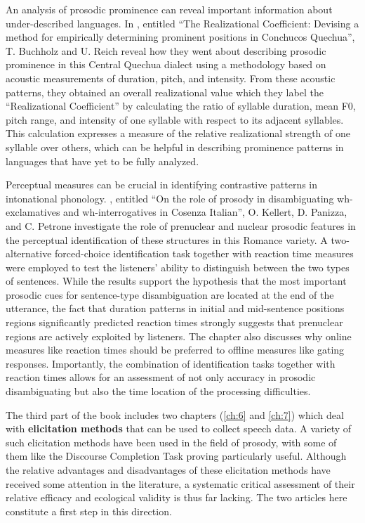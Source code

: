 \documentclass[output=paper]{langsci/langscibook}
\begin{document}
An analysis of prosodic prominence can reveal important information about under-described languages. In \textbf{}, entitled ``The Realizational Coefficient: Devising a method for empirically determining prominent positions in Conchucos Quechua”, T. Buchholz and U. Reich reveal how they went about describing prosodic prominence in this Central Quechua dialect using a methodology based on acoustic measurements of duration, pitch, and intensity. From these acoustic patterns, they obtained an overall realizational value which they label the ``Realizational Coefficient” by calculating the ratio of syllable duration, mean F0, pitch range, and intensity of one syllable with respect to its adjacent syllables. This calculation expresses a measure of the relative realizational strength of one syllable over others, which can be helpful in describing prominence patterns in languages that have yet to be fully analyzed.

Perceptual measures can be crucial in identifying contrastive patterns in intonational phonology. \textbf{}, entitled ``On the role of prosody in disambiguating wh-exclamatives and wh-interrogatives in Cosenza Italian”, O. Kellert, D. Panizza, and C. Petrone investigate the role of prenuclear and nuclear prosodic features in the perceptual identification of these structures in this Romance variety. A two-alternative forced-choice identification task together with reaction time measures were employed to test the listeners’ ability to distinguish between the two types of sentences. While the results support the hypothesis that the most important prosodic cues for sentence-type disambiguation are located at the end of the utterance, the fact that duration patterns in initial and mid-sentence positions regions significantly predicted reaction times strongly suggests that prenuclear regions are actively exploited by listeners. The chapter also discusses why online measures like reaction times should be preferred to offline measures like gating responses. Importantly, the combination of identification tasks together with reaction times allows for an assessment of not only accuracy in prosodic disambiguating but also the time location of the processing difficulties. 

The third part of the book includes two chapters (\ref{ch:6} and \ref{ch:7}) which deal with \textbf{elicitation methods} that can be used to collect speech data. A variety of such elicitation methods have been used in the field of prosody, with some of them like the Discourse Completion Task proving particularly useful. Although the relative advantages and disadvantages of these elicitation methods have received some attention in the literature, a systematic critical assessment of their relative efficacy and ecological validity is thus far lacking. The two articles here constitute a first step in this direction.
\end{document}
